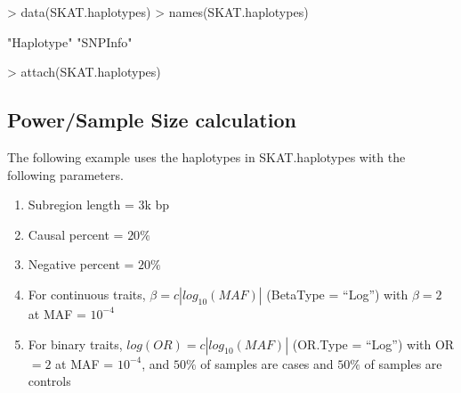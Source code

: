 \documentclass[11pt]{article}
\begin{document}
\begin{Schunk}
\begin{Sinput}
> data(SKAT.haplotypes)
> names(SKAT.haplotypes)
\end{Sinput}
\begin{Soutput}
[1] "Haplotype" "SNPInfo"  
\end{Soutput}
\begin{Sinput}
> attach(SKAT.haplotypes)
\end{Sinput}
\end{Schunk}

\subsection{Power/Sample Size calculation}

The following example uses the haplotypes in SKAT.haplotypes with the following parameters. 

\begin{enumerate}
\item Subregion length = 3k bp 
\item Causal percent = $20 \%$
\item Negative percent = $20 \%$
\item For continuous traits, $\beta = c |log_{10}(MAF)|$ (BetaType = ``Log'') with $\beta = 2$ at MAF = $10^{-4}$
\item For binary traits, $log(OR) = c |log_{10}(MAF)|$ (OR.Type = ``Log'') with OR $= 2$ at MAF = $10^{-4}$, and $50 \%$ of samples are cases and $50 \% $ of samples are controls
\end{enumerate}
\end{document}
